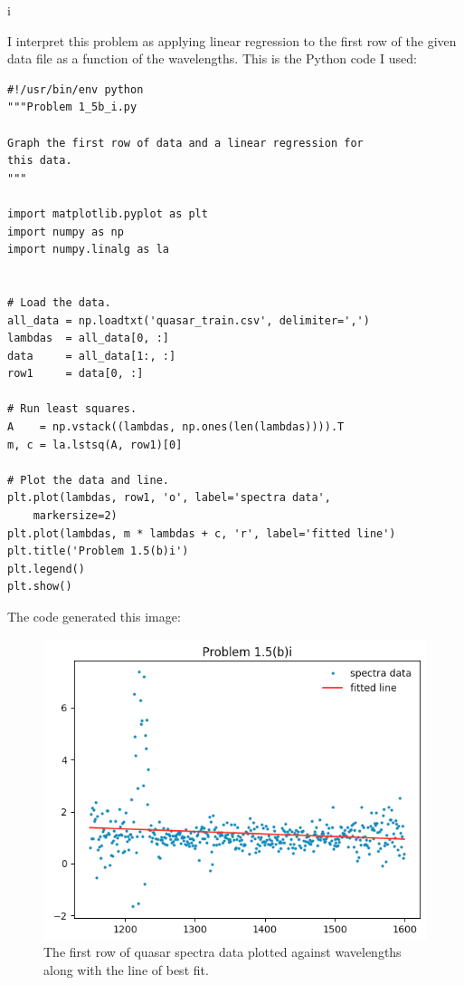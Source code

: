 \documentclass[]{article}
\begin{document}
i

I interpret this problem as applying linear regression to the first row
of the given data file as a function of the wavelengths. This is the
Python code I used:

\begin{verbatim}
#!/usr/bin/env python
"""Problem 1_5b_i.py

Graph the first row of data and a linear regression for
this data.
"""

import matplotlib.pyplot as plt
import numpy as np
import numpy.linalg as la


# Load the data.
all_data = np.loadtxt('quasar_train.csv', delimiter=',')
lambdas  = all_data[0, :]
data     = all_data[1:, :]
row1     = data[0, :]

# Run least squares.
A    = np.vstack((lambdas, np.ones(len(lambdas)))).T
m, c = la.lstsq(A, row1)[0]

# Plot the data and line.
plt.plot(lambdas, row1, 'o', label='spectra data',
    markersize=2)
plt.plot(lambdas, m * lambdas + c, 'r', label='fitted line')
plt.title('Problem 1.5(b)i')
plt.legend()
plt.show()
\end{verbatim}

The code generated this image:

\begin{figure}[htbp]
\centering
\includegraphics{images/pr1_5bi.png}
\caption{The first row of quasar spectra data plotted against
wavelengths along with the line of best fit.}
\end{figure}
\end{document}
